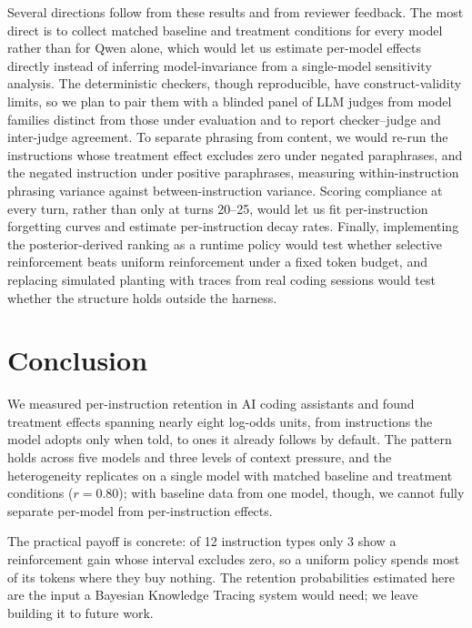 \documentclass{llncs}
\begin{document}
Several directions follow from these results and from reviewer feedback.
The most direct is to collect matched baseline and treatment conditions
for every model rather than for Qwen alone, which would let us estimate
per-model effects directly instead of inferring model-invariance from a
single-model sensitivity analysis. The deterministic checkers, though
reproducible, have construct-validity limits, so we plan to pair them with
a blinded panel of LLM judges from model families distinct from those
under evaluation and to report checker--judge and inter-judge agreement.
To separate phrasing from content, we would re-run the instructions whose
treatment effect excludes zero under negated paraphrases, and the negated
instruction under positive paraphrases, measuring within-instruction
phrasing variance against between-instruction variance. Scoring compliance
at every turn, rather than only at turns 20--25, would let us fit
per-instruction forgetting curves and estimate per-instruction decay
rates. Finally, implementing the posterior-derived ranking as a runtime
policy would test whether selective reinforcement beats uniform
reinforcement under a fixed token budget, and replacing simulated planting
with traces from real coding sessions would test whether the structure
holds outside the harness.

\section{Conclusion}
\label{sec:conclusion}

We measured per-instruction retention in AI coding assistants and found
treatment effects spanning nearly eight log-odds units, from
instructions the model adopts only when told, to ones it already follows
by default. The pattern holds across five models and three
levels of context pressure, and the heterogeneity replicates on a single
model with matched baseline and treatment conditions ($r = 0.80$); with
baseline data from one model, though, we cannot fully separate per-model
from per-instruction effects.

The practical payoff is concrete: of 12 instruction types only 3 show a
reinforcement gain whose interval excludes zero, so a uniform policy
spends most of its tokens where they buy nothing. The retention
probabilities estimated here are the input a Bayesian Knowledge Tracing
system would need; we leave building it to future work.
\end{document}

